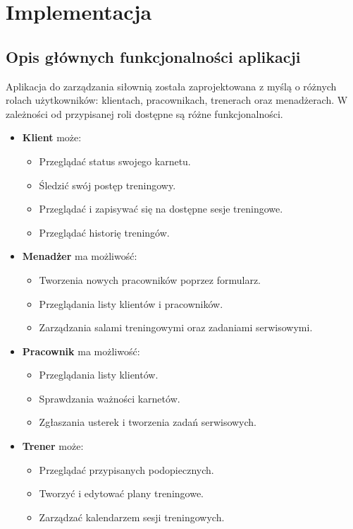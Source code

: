 \documentclass[../../spr.tex]{subfiles}
\begin{document}
\section{Implementacja}

\subsection{Opis głównych funkcjonalności aplikacji}

Aplikacja do zarządzania siłownią została zaprojektowana z myślą o różnych rolach użytkowników: klientach, pracownikach, trenerach oraz menadżerach. W zależności od przypisanej roli dostępne są różne funkcjonalności.

\begin{itemize}
  \item \textbf{Klient} może:
  \begin{itemize}
    \item Przeglądać status swojego karnetu.
    \item Śledzić swój postęp treningowy.
    \item Przeglądać i zapisywać się na dostępne sesje treningowe.
    \item Przeglądać historię treningów.
  \end{itemize}

  \item \textbf{Menadżer} ma możliwość:
  \begin{itemize}
    \item Tworzenia nowych pracowników poprzez formularz.
    \item Przeglądania listy klientów i pracowników.
    \item Zarządzania salami treningowymi oraz zadaniami serwisowymi.
  \end{itemize}
    \item \textbf{Pracownik} ma możliwość:
  \begin{itemize}
    \item Przeglądania listy klientów.
    \item Sprawdzania ważności karnetów.
    \item Zgłaszania usterek i tworzenia zadań serwisowych.
  \end{itemize}

  \item \textbf{Trener} może:
  \begin{itemize}
    \item Przeglądać przypisanych podopiecznych.
    \item Tworzyć i edytować plany treningowe.
    \item Zarządzać kalendarzem sesji treningowych.
  \end{itemize}

\end{itemize}
\end{document}
